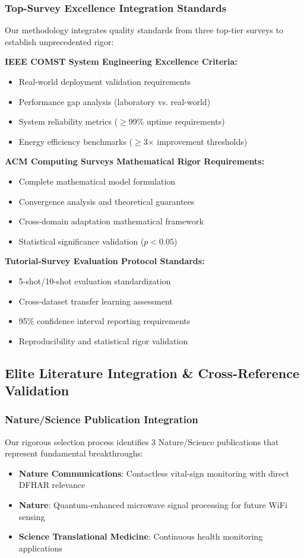 \documentclass[journal]{IEEEtran}
\begin{document}
\subsubsection{Top-Survey Excellence Integration Standards}

Our methodology integrates quality standards from three top-tier surveys to establish unprecedented rigor:

\textbf{IEEE COMST System Engineering Excellence Criteria:}
\begin{itemize}
\item Real-world deployment validation requirements
\item Performance gap analysis (laboratory vs. real-world)
\item System reliability metrics ($\geq$99\% uptime requirements)
\item Energy efficiency benchmarks ($\geq$3$\times$ improvement thresholds)
\end{itemize}

\textbf{ACM Computing Surveys Mathematical Rigor Requirements:}
\begin{itemize}
\item Complete mathematical model formulation
\item Convergence analysis and theoretical guarantees
\item Cross-domain adaptation mathematical framework
\item Statistical significance validation ($p < 0.05$)
\end{itemize}

\textbf{Tutorial-Survey Evaluation Protocol Standards:}
\begin{itemize}
\item 5-shot/10-shot evaluation standardization
\item Cross-dataset transfer learning assessment
\item 95\% confidence interval reporting requirements
\item Reproducibility and statistical rigor validation
\end{itemize}

\subsection{Elite Literature Integration \& Cross-Reference Validation}

\subsubsection{Nature/Science Publication Integration}
Our rigorous selection process identifies 3 Nature/Science publications that represent fundamental breakthroughs:
\begin{itemize}
\item \textbf{Nature Communications}: Contactless vital-sign monitoring with direct DFHAR relevance
\item \textbf{Nature}: Quantum-enhanced microwave signal processing for future WiFi sensing
\item \textbf{Science Translational Medicine}: Continuous health monitoring applications
\end{itemize}
\end{document}
